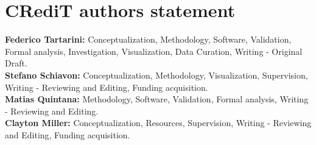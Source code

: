 \documentclass[]{article}
\begin{document}
\section*{CRediT authors statement} %
\textbf{Federico Tartarini:} Conceptualization, Methodology, Software, Validation, Formal analysis, Investigation, Visualization, Data Curation, Writing - Original Draft.\\
\textbf{Stefano Schiavon:} Conceptualization, Methodology, Visualization, Supervision, Writing - Reviewing and Editing, Funding acquisition.\\
\textbf{Matias Quintana:} Methodology, Software, Validation, Formal analysis, Writing - Reviewing and Editing.\\
\textbf{Clayton Miller:} Conceptualization, Resources, Supervision, Writing - Reviewing and Editing, Funding acquisition.
\end{document}
